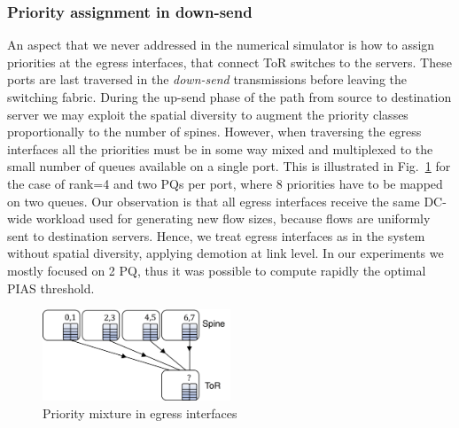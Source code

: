 \subsubsection{Priority assignment in down-send}
\label{sec:downsend-priority}
An aspect that we never addressed in the numerical simulator is how to assign priorities at the egress interfaces, that connect ToR switches to the servers. These ports are last traversed in the \emph{down-send} transmissions before leaving the switching fabric. During the up-send phase of the path from source to destination server we may exploit the spatial diversity to augment the priority classes proportionally to the number of spines. However, when traversing the egress interfaces all the priorities must be in some way mixed and multiplexed to the small number of queues available on a single port. This is illustrated in Fig.~\ref{fig:downsend} for the case of rank=4 and two PQs per port, where 8 priorities have to be mapped on two queues. Our observation is that all egress interfaces receive the same DC-wide workload used for generating new flow sizes, because flows are uniformly sent to destination servers. Hence, we treat egress interfaces as in the system without spatial diversity, applying demotion at link level. In our experiments we mostly focused on 2 PQ, thus it was possible to compute rapidly the optimal PIAS threshold.
\begin{figure}
	\centering	
	\includegraphics[width=0.5\textwidth]{Chapter4/Figures/downsend}
	\caption{Priority mixture in egress interfaces}
	\label{fig:downsend}
\end{figure}%

